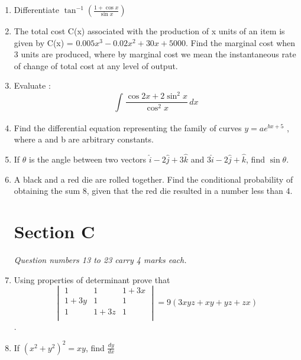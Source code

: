 \documentclass{exam}
\begin{document}
\begin{enumerate}
    \item Differentiate
    $ \tan^{-1}(\frac{1 + \cos x}{\sin x})$
    
    \item The total cost C(x) associated with the production of x units of an item is given by C(x) = 
$ 0.005x^{3} - 0.02x^{2} + 30x + 5000 $. Find the marginal cost when 3 units are produced, where by marginal cost we mean the instantaneous rate of change of total cost at any level of output.

    \item Evaluate : 
    $$ \int_{}^{} \frac{\cos 2x + 2\sin^{2} x}{\cos^{2} x} \,dx $$
    
    \item Find the differential equation representing the family of curves $ y = ae^{bx + 5} $ , where a and b are arbitrary constants.
    
    \item If $\theta$ is the angle between two vectors $\hat{i} - 2\hat{j} + 3\hat{k}$ and $3\hat{i} - 2\hat{j} + \hat{k}$, find $\sin\theta$.
    
    \item A black and a red die are rolled together. Find the conditional probability of obtaining the sum 8, given that the red die resulted in a number less than 4.
    
    \begin{center}
    \section*{Section C}
    \end{center}
    
    \begin{flushleft}
    \textit{Question numbers 13 to 23 carry 4 marks each.}
    \end{flushleft}
    
    \item \noindent Using properties of determinant prove that
     $$\begin{vmatrix}
     1 & 1 & 1 + 3x \\
     1 + 3y & 1 & 1 \\
     1 & 1 + 3z & 1 \\
     \end{vmatrix} 
     = 9(3xyz + xy + yz + zx)$$.
     
     \item If 
     $ (x^{2} + y^{2})^{2} = xy $, find $ \frac{dy}{dx}$
     

\end{enumerate}
\end{document}
